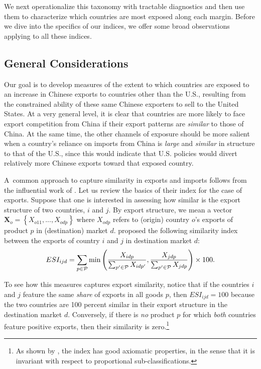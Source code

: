 \documentclass[english,12pt]{article}
\theoremstyle{definition}
\begin{document}
We next operationalize this taxonomy with tractable diagnostics and then use
them to characterize which countries are most exposed along each margin.
Before we dive into the specifics of our indices, we offer some broad
observations applying to all these indices.

\subsection{General Considerations}

Our goal is to develop measures of the extent to which countries are exposed
to an increase in Chinese exports to countries other than the U.S.,
resulting from the constrained ability of these same Chinese exporters to
sell to the United States. At a very general level, it is clear that
countries are more likely to face export competition from China if their
export patterns are \emph{similar} to those of China. At the same time, the
other channels of exposure should be more salient when a country's reliance
on imports from China is \emph{large} and \emph{similar} in structure to
that of the U.S., since this would indicate that U.S. policies would divert
relatively more Chinese exports toward that exposed country.

A\ common approach to capture similarity in exports and imports follows from
the influential work of \cite{FingerKreinin1979ExportSimilarity}. Let us
review the basics of their index for the case of exports. Suppose that one
is interested in assessing how similar is the export structure of two
countries, $i$ and $j$. By export structure, we mean a vector $\mathbf{X}%
_{o}=\left\{ X_{o11},...,X_{odp}\right\} $ where $X_{odp}$ refers to
(origin) country $o$'s exports of product $p$ in (destination) market $d$. 
\cite{FingerKreinin1979ExportSimilarity} proposed the following similarity
index between the exports of country $i$ and $j$ in destination market $d$:%
\begin{equation}
ESI_{ijd}=\sum_{p\in \mathcal{P}}\min \left( \frac{X_{idp}}{%
\sum\nolimits_{p^{\prime }\in \mathcal{P}}X_{idp^{\prime }}},\frac{X_{jdp}}{%
\sum\nolimits_{p^{\prime }\in \mathcal{P}}X_{jdp}}\right) \times 100.
\label{eq: FingerKreinin}
\end{equation}

To see how this measures captures export similarity, notice that if the
countries $i$ and $j$ feature the same \emph{share} of exports in all goods $%
p$, then $ESI_{ijd}=100$ because the two countries are 100 percent similar
in their export structure in the destination market $d$. Conversely, if
there is \emph{no} product $p$ for which \emph{both} countries feature
positive exports, then their similarity is zero.\footnote{%
As shown by \cite{sun2000measurement}, the \cite%
{FingerKreinin1979ExportSimilarity} index has good axiomatic properties, in
the sense that it is invariant with respect to proportional
sub-classifications.}
\end{document}
